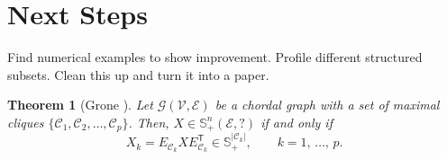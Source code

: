 \documentclass{article}
\newcommand{\tr}{{\mathsf T}}
\newtheorem{theorem}{Theorem}
\begin{document}
\section{Next Steps}
Find numerical examples to show improvement. Profile different structured subsets. Clean this up and turn it into a paper.

\begin{theorem} [Grone \cite{grone1984positive}] \label{T:GroneTheorem}
     Let $\mathcal{G}(\mathcal{V},\mathcal{E})$ be a chordal graph with a set of maximal cliques $\{\mathcal{C}_1,\mathcal{C}_2, \ldots, \mathcal{C}_p\}$. Then, $X\in\mathbb{S}^n_+(\mathcal{E},?)$ if and only if
     $$ X_k = E_{\mathcal{C}_k} X E_{\mathcal{C}_k}^\tr \in \mathbb{S}^{\vert \mathcal{C}_k \vert}_+,
    \qquad k=1,\,\ldots,\,p.$$
    \end{theorem}

\medskip


\end{document}
